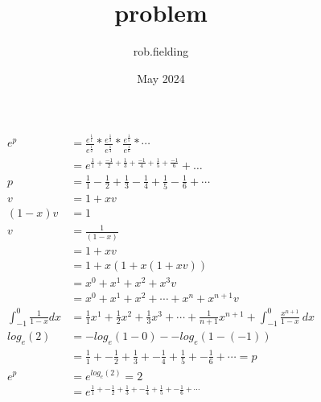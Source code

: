 \documentclass{article}
\title{problem}
\author{rob.fielding }
\date{May 2024}
\begin{document}
\begin{align*}
  e^p &= \frac{e^{\frac{1}{1}}}{e^{\frac{1}{2}}} *
  \frac{e^{\frac{1}{3}}}{e^{\frac{1}{4}}} *
  \frac{e^{\frac{1}{5}}}{e^{\frac{1}{6}}} * 
  \cdots \\
  &= e^{\frac{1}{1} + \frac{-1}{2} + \frac{1}{3} + \frac{-1}{4} + \frac{1}{5} + \frac{-1}{6}} + \dots \\
  p &= \frac{1}{1} - \frac{1}{2} + \frac{1}{3} - \frac{1}{4} + \frac{1}{5} - \frac{1}{6} + \cdots \\
  v &= 1 + x v \\
  (1 - x)v &= 1 \\
  v &= \frac{1}{(1 - x)} \\
    &= 1 + x v \\
    &= 1 + x (1 + x ( 1 + x v)) \\
    &= x^0 + x^1 + x^2 + x^3 v\\
    &= x^0 + x^1 + x^2 + \cdots + x^n + x^{n+1} v \\
  \int_{-1}^0 \frac{1}{1-x} dx &= \frac{1}{1}x^1 + \frac{1}{2}x^2 + \frac{1}{3}x^3 + \cdots + \frac{1}{n+1}x^{n+1} + \int_{-1}^0 
 \frac{x^{n+1}}{1-x}\ dx \\
  log_e(2) &= -log_e(1 - 0) - -log_e(1 - (-1)) \\
   &= \frac{1}{1} + -\frac{1}{2} +\frac{1}{3} + -\frac{1}{4} + \frac{1}{5} + -\frac{1}{6} + \cdots = p \\
  e^p &= e^{log_e(2)} = 2 \\
   &= e^{\frac{1}{1} + -\frac{1}{2} +\frac{1}{3} + -\frac{1}{4} + \frac{1}{5} + -\frac{1}{6} + \cdots} \\
\end{align*}
\end{document}
